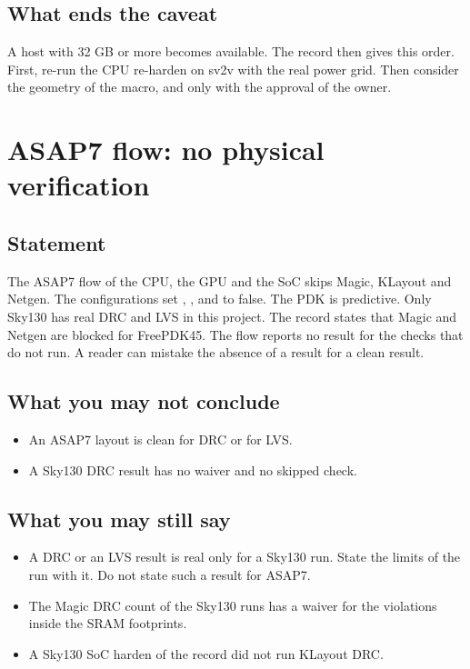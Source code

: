 \subsection*{What ends the caveat}
A host with 32 GB or more becomes available. The record then gives this order. First, re-run the CPU re-harden on sv2v with the real power grid. Then consider the geometry of the macro, and only with the approval of the owner.

\section{ASAP7 flow: no physical verification}\label{tm:caveat:asap7-no-physical-verification}
\subsection*{Statement}
The ASAP7 flow of the CPU, the GPU and the SoC skips Magic, KLayout and Netgen. The configurations set , ,  and  to false. The PDK is predictive. Only Sky130 has real DRC and LVS in this project. The record states that Magic and Netgen are blocked for FreePDK45. The flow reports no result for the checks that do not run. A reader can mistake the absence of a result for a clean result.

\subsection*{What you may not conclude}
\begin{itemize}
  \item An ASAP7 layout is clean for DRC or for LVS.
  \item A Sky130 DRC result has no waiver and no skipped check.
\end{itemize}

\subsection*{What you may still say}
\begin{itemize}
  \item A DRC or an LVS result is real only for a Sky130 run. State the limits of the run with it. Do not state such a result for ASAP7.
  \item The Magic DRC count of the Sky130 runs has a waiver for the violations inside the SRAM footprints.
  \item A Sky130 SoC harden of the record did not run KLayout DRC.
\end{itemize}

